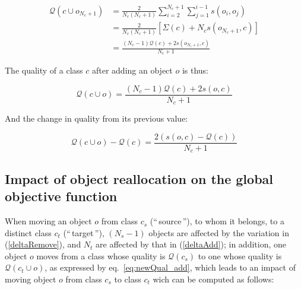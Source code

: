 \documentclass[natbib,smallextended]{svjour3}
\newcommand{\gl}[1]{``\,#1\,''} %
\begin{document}
\begin{equation*}
  \begin{aligned}
    \mathcal{Q}(c \cup o_{N_c+1}) & = \frac{2}{N_c(N_c+1)} \sum_{i=2}^{N_c+1} \sum_{j=1}^{i-1} s\left(o_i, o_j\right) \\
                                & = \frac{2}{N_c(N_c+1)} \left[\Sigma(c) + N_c s\left(o_{N_c+1}, c\right)\right] \\
                                & = \frac{(N_c-1) \mathcal{Q}(c)  + 2s\left(o_{N_c+1}, c\right)}{N_c+1}
  \end{aligned}
\end{equation*}

\noindent The quality of a class $c$ after adding an object $o$ is thus:

\begin{equation}
  \mathcal{Q}\left(c \cup o\right) = \frac{(N_c-1) \mathcal{Q}(c)  + 2s\left(o, c\right)}{N_c+1}
  \label{eq:newQual_add}
\end{equation}

\noindent And the change in quality from its previous value:

\begin{equation} \label{deltaAdd}
    \mathcal{Q}\left(c \cup o\right) - \mathcal{Q}\left(c\right)  = \frac{2\left(s\left(o, c\right)-\mathcal{Q}(c)\right)}{N_c+1}
\end{equation}


\subsection{Impact of object reallocation on the global objective function}
\label{sec:delta_definition}

When moving an object $o$ from class $c_s$ (\gl{source}), to whom it belongs, to a
distinct class $c_t$ (\gl{target}), $(N_s-1)$ objects are affected
by the variation in (\ref{deltaRemove}), and $N_t$ are affected
by that in (\ref{deltaAdd}); in addition, one object $o$ moves from a class whose quality is $\mathcal{Q}(c_s)$ to one whose quality is $\mathcal{Q}\left(c_t \cup o\right)$, as expressed by eq.~\ref{eq:newQual_add}, which leads to an impact of moving object $o$ from class $c_s$ to class $c_t$ wich can be computed as follows:
\end{document}
